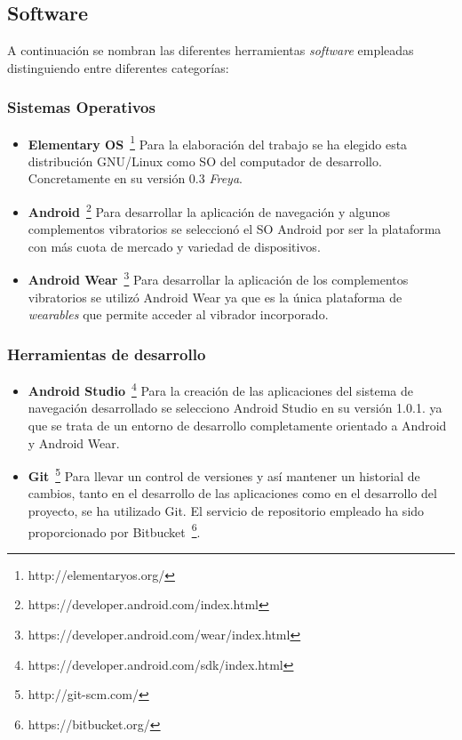 \subsection{Software}
\label{sec:herramientasSoftware}

A continuación se nombran las diferentes herramientas \emph{software} empleadas distinguiendo entre
diferentes categorías:

\subsubsection{Sistemas Operativos}

\begin{itemize}
  \item \textbf{Elementary OS}~\footnote{http://elementaryos.org/} Para la elaboración del trabajo
    se ha elegido esta distribución GNU/Linux como \acs{SO} del computador de
    desarrollo. Concretamente en su versión 0.3 \emph{Freya}.

  \item \textbf{Android}~\footnote{https://developer.android.com/index.html} Para desarrollar
    la aplicación de navegación y algunos complementos vibratorios se seleccionó el \acs{SO}
    Android por ser la plataforma con más cuota de mercado y variedad de dispositivos.

  \item \textbf{Android Wear}~\footnote{https://developer.android.com/wear/index.html} Para
    desarrollar la aplicación de los complementos vibratorios se utilizó Android Wear ya que es la
    única plataforma de \emph{wearables} que permite acceder al vibrador incorporado.

\end{itemize}

\subsubsection{Herramientas de desarrollo}

\begin{itemize}
  \item \textbf{Android Studio}~\footnote{https://developer.android.com/sdk/index.html} Para la
    creación de las aplicaciones del sistema de navegación desarrollado se selecciono Android Studio
    en su versión 1.0.1. ya que se trata de un entorno de desarrollo completamente orientado a
    Android y Android Wear.

  \item \textbf{Git}~\footnote{http://git-scm.com/} Para llevar un control de versiones y así
    mantener un historial de cambios, tanto en el desarrollo de las aplicaciones como en el
    desarrollo del proyecto, se ha utilizado Git. El servicio de repositorio empleado ha sido
    proporcionado por Bitbucket~\footnote{https://bitbucket.org/}.

\end{itemize}

